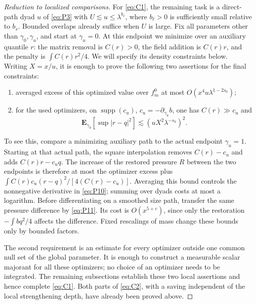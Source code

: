 \begin{proof}[Reduction to localized comparisons]
For \eqref{eq:C1}, the remaining task is a direct-path dyad \(u\) of
\eqref{eq:P3} with \(U\lesssim u\le\lambda^{b_\ell}\), where
\(b_\ell>0\) is sufficiently small relative to \(b_s\). Bounded
overlaps already suffice when \(U\) is large. Fix all parameters
other than \(\gamma_0,\gamma_u\), and start at \(\gamma_u=0\).
At this endpoint we minimize over an auxiliary quantile \(r\): the
matrix removal is \(C(r)>0\), the field addition is \(C(r)r\),
and the penalty is \(\int C(r)r^2/4\). We will specify its density
constraints below. Writing \(X=x/u\), it is enough to prove the
following two assertions for the final constraints:

\begin{enumerate}[label=(\roman*)]

\item averaged excess of this optimized value over \(f_m^0\) at most \(O(x^4 u\lambda^{1-2s_0})\);
\item for the used optimizers, on \(\operatorname{supp}(c_u)\), \(c_u=-\partial_{\gamma_u}b\), one has \(C(r)\gg c_u\) and
\[
 \mathbf E_{\gamma_0}\left[\sup |r-q|^2\right]
           \lesssim (u X^2\lambda^{-s_0})^2 .                            \tag{C3}\label{eq:C3}
\]

\end{enumerate}


To see this, compare a minimizing auxiliary path to the actual endpoint
\(\gamma_u=1\). Starting at that actual path, the square interpolation
removes \(C(r)-c_u\) and adds \(C(r)r-c_uq\). The increase of the
restored pressure \(R\) between the two endpoints is therefore at most
the optimizer excess plus
\(\int C(r)c_u(r-q)^2/[4(C(r)-c_u)]\).
Averaging this bound controls the nonnegative derivative in
\eqref{eq:P10}; summing over dyads costs at most a logarithm.
Before differentiating on a smoothed size path, transfer the same
pressure difference by \eqref{eq:P11}. Its cost is \(O(x^{5+c})\),
since only the restoration \(-\int bq^2/4\) affects the difference.
Fixed rescalings of mass change these bounds only by bounded factors.

The second requirement is an estimate for every optimizer outside one
common null set of the global parameter.  It is enough to construct a
measurable scalar majorant for all these optimizers; no choice of an
optimizer needs to be integrated.  The remaining subsections establish
these two local assertions and hence complete \eqref{eq:C1}. Both
parts of \eqref{eq:C2}, with a saving independent of the local
strengthening depth, have already been proved above.
\end{proof}



